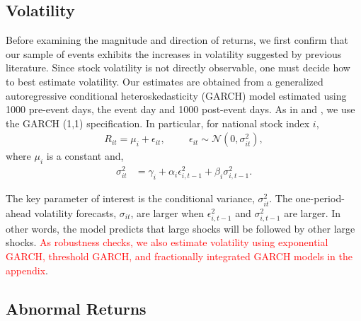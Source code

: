 \documentclass[12pt,final,fleqn]{article}
\theoremstyle{plain}
\begin{document}
\subsection{Volatility} \label{subsec: Volatility_estimation}

Before examining the magnitude and direction of returns, we first confirm that our sample of events exhibits the increases in volatility suggested by previous literature. Since stock volatility is not directly observable, one must decide how to best estimate volatility. Our estimates are obtained from a generalized autoregressive conditional heteroskedasticity (GARCH) model estimated using 1000 pre-event days, the event day and 1000 post-event days. As in \citet{jensen2005market} and \citet{leblang2005government}, we use the GARCH (1,1) specification. In particular, for national stock index $i$,
\begin{align*}
R_{it}=\mu_i + \epsilon_{it},\hspace{1cm} \epsilon_{it}\sim \mathcal{N}\left(0,\sigma_{it}^2\right),
\end{align*}
where $\mu_i$ is a constant and,
\begin{align*}
\sigma_{it}^2&=\gamma_{i}+\alpha_{i}\epsilon_{i,t-1}^2+\beta_{i}\sigma_{i,t-1}^2.
\end{align*}

The key parameter of interest is the conditional variance, $\sigma_{it}^2$. The one-period-ahead volatility forecasts, $\sigma_{it}$, are larger when $\epsilon_{i,t-1}^2$ and $\sigma_{i,t-1}^2$ are larger. In other words, the model predicts that large shocks will be followed by other large shocks. \textcolor{red}{As robustness checks, we also estimate volatility using exponential GARCH, threshold GARCH, and fractionally integrated GARCH models in the appendix}. 

\subsection{Abnormal Returns} \label{subsec:abnormal-returns_estimation}
\end{document}
